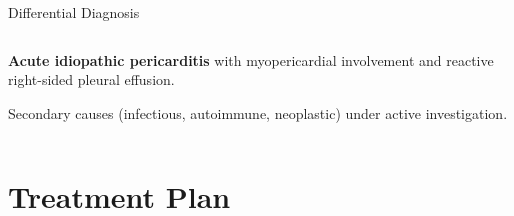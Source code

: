 \documentclass[10pt,aspectratio=169]{beamer}
\begin{document}
\begin{frame}{Differential Diagnosis}
\begin{columns}[T]
    \begin{tcolorbox}[highlightbox,title={\faCheck\hspace{4pt}Working Diagnosis}]
      \small
      \textbf{Acute idiopathic pericarditis} with myopericardial involvement and reactive right-sided pleural effusion.
      \par\vspace{4pt}
      Secondary causes (infectious, autoimmune, neoplastic) under active investigation.
    \end{tcolorbox}
  \end{columns}
\end{frame}

\section{Treatment Plan}
\end{document}
